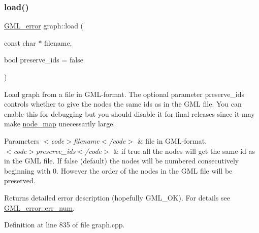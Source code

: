 \subsubsection{\texorpdfstring{load()}{load()}\hspace{0.1cm}{\footnotesize\ttfamily [2/2]}}
{\footnotesize\ttfamily \mbox{\hyperlink{struct_g_m_l__error}{G\+M\+L\+\_\+error}} graph\+::load (\begin{DoxyParamCaption}\item[{const char $\ast$}]{filename,  }\item[{bool}]{preserve\+\_\+ids = {\ttfamily false} }\end{DoxyParamCaption})}

Load graph from a file in G\+M\+L-\/format. The optional parameter {\ttfamily preserve\+\_\+ids} controls whether to give the nodes the same ids as in the G\+ML file. You can enable this for debugging but you should disable it for final releases since it may make {\ttfamily \mbox{\hyperlink{classnode__map}{node\+\_\+map}}} unecessarily large. ~\newline
 
\begin{DoxyParams}{Parameters}
{\em $<$code$>$filename$<$/code$>$} & file in G\+M\+L-\/format. \\
\hline
{\em $<$code$>$preserve\+\_\+ids$<$/code$>$} & if true all the nodes will get the same id as in the G\+ML file. If false (default) the nodes will be numbered consecutively beginning with 0. However the order of the nodes in the G\+ML file will be preserved. \\
\hline
\end{DoxyParams}
\begin{DoxyReturn}{Returns}
detailed error description (hopefully G\+M\+L\+\_\+\+OK). For details see \mbox{\hyperlink{struct_g_m_l__error_a66fe2c5a3d2d40e77ff486007dfe7f76}{G\+M\+L\+\_\+error\+::err\+\_\+num}}. 
\end{DoxyReturn}


Definition at line 835 of file graph.\+cpp.


